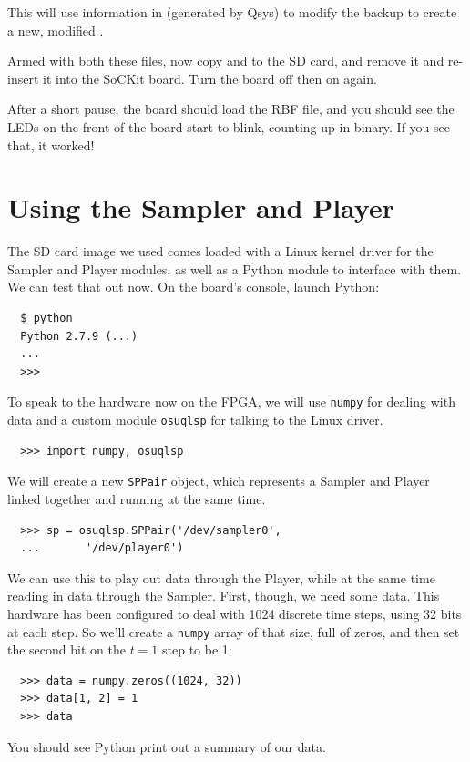 \documentclass{sockitguide}
\begin{document}
This will use information in 
(generated by Qsys) to modify the backup  to
create a new, modified .

Armed with both these files, now copy  and
 to the SD card, and remove it and re-insert it
into the SoCKit board. Turn the board off then on again.

After a short pause, the board should load the RBF file, and you
should see the LEDs on the front of the board start to blink, counting
up in binary. If you see that, it worked!

\section{Using the Sampler and Player}

The SD card image we used comes loaded with a Linux kernel driver for
the Sampler and Player modules, as well as a Python module to
interface with them. We can test that out now. On the board's console,
launch Python:
\begin{verbatim}
  $ python
  Python 2.7.9 (...)
  ...
  >>>
\end{verbatim}

To speak to the hardware now on the FPGA, we will use \texttt{numpy}
for dealing with data and a custom module \texttt{osuqlsp} for talking
to the Linux driver.
\begin{verbatim}
  >>> import numpy, osuqlsp
\end{verbatim}

We will create a new \texttt{SPPair} object, which represents a
Sampler and Player linked together and running at the same time.
\begin{verbatim}
  >>> sp = osuqlsp.SPPair('/dev/sampler0',
  ...       '/dev/player0')
\end{verbatim}

We can use this to play out data through the Player, while at the same
time reading in data through the Sampler. First, though, we need some
data. This hardware has been configured to deal with \num{1024}
discrete time steps, using \num{32} bits at each step. So we'll create
a \texttt{numpy} array of that size, full of zeros, and then set the
second bit on the $t = 1$ step to be \num{1}:
\begin{verbatim}
  >>> data = numpy.zeros((1024, 32))
  >>> data[1, 2] = 1
  >>> data
\end{verbatim}
You should see Python print out a summary of our data.
\end{document}
